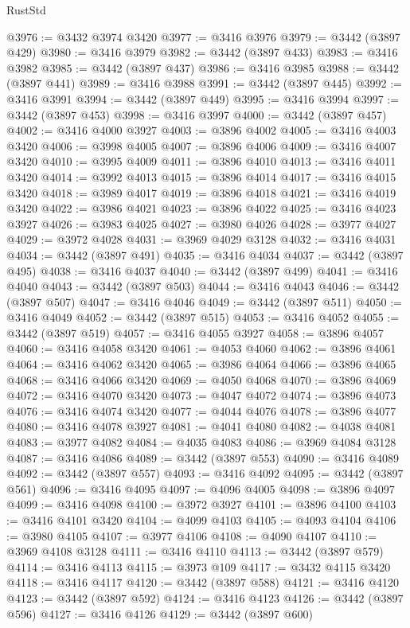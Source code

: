 \begin{lexlean}{RustStd}
\begin{coremodule}
@3976 := @3432 @3974 @3420
@3977 := @3416 @3976
@3979 := @3442 (@3897 @429)
@3980 := @3416 @3979
@3982 := @3442 (@3897 @433)
@3983 := @3416 @3982
@3985 := @3442 (@3897 @437)
@3986 := @3416 @3985
@3988 := @3442 (@3897 @441)
@3989 := @3416 @3988
@3991 := @3442 (@3897 @445)
@3992 := @3416 @3991
@3994 := @3442 (@3897 @449)
@3995 := @3416 @3994
@3997 := @3442 (@3897 @453)
@3998 := @3416 @3997
@4000 := @3442 (@3897 @457)
@4002 := @3416 @4000 @3927
@4003 := @3896 @4002
@4005 := @3416 @4003 @3420
@4006 := @3998 @4005
@4007 := @3896 @4006
@4009 := @3416 @4007 @3420
@4010 := @3995 @4009
@4011 := @3896 @4010
@4013 := @3416 @4011 @3420
@4014 := @3992 @4013
@4015 := @3896 @4014
@4017 := @3416 @4015 @3420
@4018 := @3989 @4017
@4019 := @3896 @4018
@4021 := @3416 @4019 @3420
@4022 := @3986 @4021
@4023 := @3896 @4022
@4025 := @3416 @4023 @3927
@4026 := @3983 @4025
@4027 := @3980 @4026
@4028 := @3977 @4027
@4029 := @3972 @4028
@4031 := @3969 @4029 @3128
@4032 := @3416 @4031
@4034 := @3442 (@3897 @491)
@4035 := @3416 @4034
@4037 := @3442 (@3897 @495)
@4038 := @3416 @4037
@4040 := @3442 (@3897 @499)
@4041 := @3416 @4040
@4043 := @3442 (@3897 @503)
@4044 := @3416 @4043
@4046 := @3442 (@3897 @507)
@4047 := @3416 @4046
@4049 := @3442 (@3897 @511)
@4050 := @3416 @4049
@4052 := @3442 (@3897 @515)
@4053 := @3416 @4052
@4055 := @3442 (@3897 @519)
@4057 := @3416 @4055 @3927
@4058 := @3896 @4057
@4060 := @3416 @4058 @3420
@4061 := @4053 @4060
@4062 := @3896 @4061
@4064 := @3416 @4062 @3420
@4065 := @3986 @4064
@4066 := @3896 @4065
@4068 := @3416 @4066 @3420
@4069 := @4050 @4068
@4070 := @3896 @4069
@4072 := @3416 @4070 @3420
@4073 := @4047 @4072
@4074 := @3896 @4073
@4076 := @3416 @4074 @3420
@4077 := @4044 @4076
@4078 := @3896 @4077
@4080 := @3416 @4078 @3927
@4081 := @4041 @4080
@4082 := @4038 @4081
@4083 := @3977 @4082
@4084 := @4035 @4083
@4086 := @3969 @4084 @3128
@4087 := @3416 @4086
@4089 := @3442 (@3897 @553)
@4090 := @3416 @4089
@4092 := @3442 (@3897 @557)
@4093 := @3416 @4092
@4095 := @3442 (@3897 @561)
@4096 := @3416 @4095
@4097 := @4096 @4005
@4098 := @3896 @4097
@4099 := @3416 @4098
@4100 := @3972 @3927
@4101 := @3896 @4100
@4103 := @3416 @4101 @3420
@4104 := @4099 @4103
@4105 := @4093 @4104
@4106 := @3980 @4105
@4107 := @3977 @4106
@4108 := @4090 @4107
@4110 := @3969 @4108 @3128
@4111 := @3416 @4110
@4113 := @3442 (@3897 @579)
@4114 := @3416 @4113
@4115 := @3973 @109
@4117 := @3432 @4115 @3420
@4118 := @3416 @4117
@4120 := @3442 (@3897 @588)
@4121 := @3416 @4120
@4123 := @3442 (@3897 @592)
@4124 := @3416 @4123
@4126 := @3442 (@3897 @596)
@4127 := @3416 @4126
@4129 := @3442 (@3897 @600)

\end{coremodule}
\end{lexlean}
